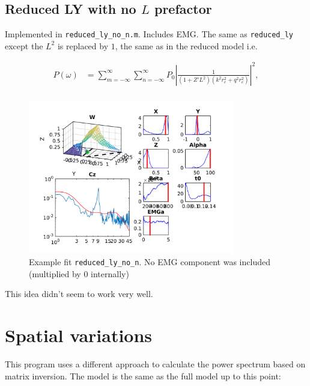 \documentclass[10pt,a4paper]{article}
\begin{document}
\clearpage

\subsection{Reduced LY with no $L$ prefactor}
Implemented in {\tt reduced\_ly\_no\_n.m}. Includes EMG. The same as \texttt{reduced\_ly} except the $L^2$ is replaced by $1$, the same as in the reduced model i.e.

\begin{align}
	P(\omega) &= \sum_{m = -\infty}^{\infty}\sum_{n = -\infty}^{\infty} P_0 \left| \frac{1}{(1+Z'L^2)(k^2r_e^2+q^2r_e^2)}\right|^2,\\[14pt]
\end{align}

\begin{figure}[h!]
\begin{center}
\includegraphics[width=0.8\textwidth]{example_reduced_ly_no_n}
\caption{Example fit \texttt{reduced\_ly\_no\_n}. No EMG component was included (multiplied by 0 internally)}
\label{fig:full}
\end{center}
\end{figure}

This idea didn't seem to work very well. 


\clearpage
\section{Spatial variations}
This program uses a different approach to calculate the power spectrum based on matrix inversion. The model is the same as the full model up to this point: 
\end{document}
